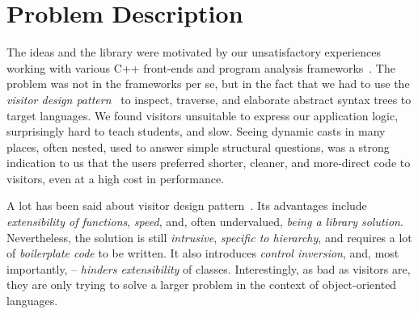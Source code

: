 \section{Problem Description} %
\label{sec:probl}

The ideas and the library were motivated by our unsatisfactory experiences 
working with various C++ front-ends and program analysis 
frameworks~\cite{Pivot09,Phoenix,Clang,Liz}.
The problem was not in the frameworks per se, but in the fact that we had to use
the \emph{visitor design pattern}~\cite{DesignPatterns1993} to inspect, traverse, and 
elaborate abstract syntax trees to target languages. We found visitors 
unsuitable to express our application logic, surprisingly hard to teach 
students, and slow. Seeing dynamic casts in many places, often nested, used to 
answer simple structural questions, was a strong indication to us that the users 
preferred shorter, cleaner, and more-direct code to visitors, even at a high 
cost in performance.

A lot has been said about visitor design pattern~\cite{DesignPatterns1993,Zenger:2001}. 
Its advantages include \emph{extensibility of functions}, \emph{speed}, and, 
often undervalued, \emph{being a library solution}. Nevertheless, the solution 
is still \emph{intrusive}, \emph{specific to hierarchy}, and requires a lot of 
\emph{boilerplate code} to be written. It also introduces \emph{control 
inversion}, and, most importantly, -- \emph{hinders extensibility} of classes.
Interestingly, as bad as visitors are, they are only trying to solve a larger 
problem in the context of object-oriented languages.



